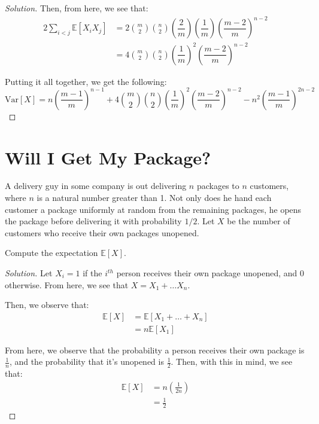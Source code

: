 \documentclass{article}
\newenvironment{solution}{\begin{proof}[Solution]}{\end{proof}}
\let\oldsum\sum
\renewcommand{\sum}[2]{\oldsum\limits_{#1}^{#2}}
\begin{document}
\begin{solution}
	Then, from here, we see that:
	\begin{align*}
		2\sum{i<j}{} \mathbb{E}[X_{i}X_{j}] &= 2\binom{m}{2}\binom{n}{2}\left( \dfrac{2}{m} \right)\left( \dfrac{1}{m} \right)\left( \dfrac{m-2}{m} \right)^{n-2} \\
		&= 4 \binom{m}{2} \binom{n}{2} \left( \dfrac{1}{m} \right)^{2}\left( \dfrac{m-2}{m} \right)^{n-2}
	\end{align*}

	Putting it all together, we get the following:
	\begin{equation*}
		\mathrm{Var}[X] = n\left( \dfrac{m-1}{m} \right)^{n-1} + 4 \binom{m}{2} \binom{n}{2} \left( \dfrac{1}{m} \right)^{2}\left( \dfrac{m-2}{m} \right)^{n-2} - n^{2}\left( \dfrac{m-1}{m} \right)^{2n-2}
	\end{equation*}
\end{solution}

\newpage

\section{Will I Get My Package?}
A delivery guy in some company is out delivering $n$ packages to $n$ customers, where $n$ is a natural number greater than 1.
Not only does he hand each customer a package uniformly at random from the remaining packages, he opens the package before delivering it with probability $1/2$.
Let $X$ be the number of customers who receive their own packages unopened. 

\begin{hw}
	Compute the expectation $\mathbb{E}[X]$.
\end{hw}
\begin{solution}
	Let $X_{i} = 1$ if the $i^{th}$ person receives their own package unopened, and 0 otherwise. From here, we see that $X = X_{1} + \ldots X_{n}$.
	
	Then, we observe that:
	\begin{align*}
		\mathbb{E}[X] &= \mathbb{E}[X_{1} + \ldots + X_{n}] \\
		&= n\mathbb{E}[X_{1}]
	\end{align*}

	From here, we observe that the probability a person receives their own package is $\frac{1}{n}$, and the probability that it's unopened is $\frac{1}{2}$. Then, with this in mind, we see that:
	\begin{align*}
		\mathbb{E}[X] &= n\left( \frac{1}{2n} \right) \\
		&= \frac{1}{2}
	\end{align*}
\end{solution}
\end{document}
